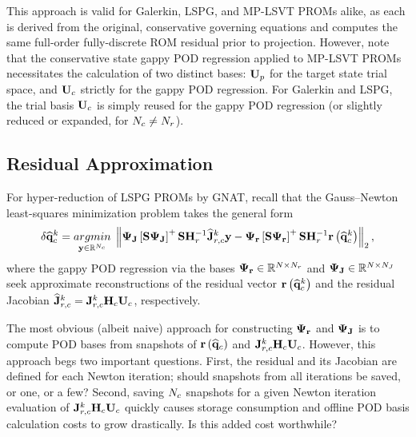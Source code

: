 This approach is valid for Galerkin, LSPG, and MP-LSVT PROMs alike, as each is derived from the original, conservative governing equations and computes the same full-order fully-discrete ROM residual prior to projection. However, note that the conservative state gappy POD regression applied to MP-LSVT PROMs necessitates the calculation of two distinct bases: $\primTrial$ for the target state trial space, and $\consTrial$ strictly for the gappy POD regression. For Galerkin and LSPG, the trial basis $\consTrial$ is simply reused for the gappy POD regression (or slightly reduced or expanded, for $N_c \neq N_r$).

\subsection{Residual Approximation}
%
For hyper-reduction of LSPG PROMs by GNAT, recall that the Gauss--Newton least-squares minimization problem takes the general form
%
\begin{equation}
    \delta \consVecCoef^{\newtonIdx} = \argmin{\dummyVec \inROne{\numConsModes}} \left\Vert \deimBasisJacob \left[ \sampMat \deimBasisJacob \right]^{+} \sampMat \resScaleInv \jacobResCoefCons^{\newtonIdx} \dummyVec - \deimBasisRes \left[ \sampMat \deimBasisRes \right]^{+} \sampMat \resScaleInv \resFunc{\consVecCoef^{\newtonIdx}} \right\Vert_2,
\end{equation}
%
where the gappy POD regression via the bases $\deimBasisRes \inRTwo{\numDOF}{\numResModes}$ and $\deimBasisJacob \inRTwo{\numDOF}{\numJacobModes}$ seek approximate reconstructions of the residual vector $\mathbf{r}\left(\mathbf{\widehat{q}}_{c}^{k}\right)$ and the residual Jacobian $\jacobResCoefCons^{\newtonIdx} = \jacobResCons^{\newtonIdx} \consScale \consTrial$, respectively.

The most obvious (albeit naive) approach for constructing $\deimBasisRes$ and $\deimBasisJacob$ is to compute POD bases from snapshots of $\mathbf{r}\left(\mathbf{\widehat{q}}_{c}\right)$ and $\jacobResCons^{\newtonIdx} \consScale \consTrial$. However, this approach begs two important questions. First, the residual and its Jacobian are defined for each Newton iteration; should snapshots from all iterations be saved, or one, or a few? Second, saving $N_c$ snapshots for a given Newton iteration evaluation of $\jacobResCons^{\newtonIdx} \consScale \consTrial$ quickly causes storage consumption and offline POD basis calculation costs to grow drastically. Is this added cost worthwhile?

